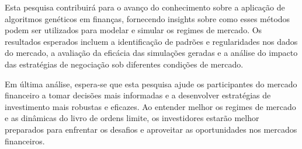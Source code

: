 Esta pesquisa contribuirá para o avanço do conhecimento sobre a aplicação de algoritmos genéticos em finanças, fornecendo insights sobre como esses métodos podem ser utilizados para modelar e simular os regimes de mercado. Os resultados esperados incluem a identificação de padrões e regularidades nos dados do mercado, a avaliação da eficácia das simulações geradas e a análise do impacto das estratégias de negociação sob diferentes condições de mercado.

Em última análise, espera-se que esta pesquisa ajude os participantes do mercado financeiro a tomar decisões mais informadas e a desenvolver estratégias de investimento mais robustas e eficazes. Ao entender melhor os regimes de mercado e as dinâmicas do livro de ordens limite, os investidores estarão melhor preparados para enfrentar os desafios e aproveitar as oportunidades nos mercados financeiros.
